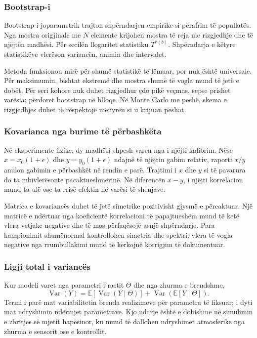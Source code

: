 \documentclass[11pt,oneside,openany]{book}
\newcommand{\E}{\mathbb{E}}
\newcommand{\Var}{\operatorname{Var}}
\begin{document}
\subsubsection{Bootstrap-i}
Bootstrap-i joparametrik trajton shpërndarjen empirike si përafrim të popullatës. Nga mostra origjinale me $N$ elemente krijohen mostra të reja me rizgjedhje dhe të njëjtën madhësi. Për secilën llogaritet statistiku $T^{*(b)}$. Shpërndarja e këtyre statistikëve vlerëson variancën, animin dhe intervalet.

Metoda funksionon mirë për shumë statistikë të lëmuar, por nuk është universale. Për maksimumin, bishtat ekstremë dhe mostra shumë të vogla mund të jetë e dobët. Për seri kohore nuk duhet rizgjedhur çdo pikë veçmas, sepse prishet varësia; përdoret bootstrap në blloqe. Në Monte Carlo me peshë, skema e rizgjedhjes duhet të respektojë mënyrën si u krijuan peshat.

\subsubsection{Kovarianca nga burime të përbashkëta}
Në eksperimente fizike, dy madhësi shpesh varen nga i njëjti kalibrim. Nëse $x=x_0(1+\epsilon)$ dhe $y=y_0(1+\epsilon)$ ndajnë të njëjtin gabim relativ, raporti $x/y$ anulon gabimin e përbashkët në rendin e parë. Trajtimi i $x$ dhe $y$ si të pavarura do ta mbivlerësonte pacaktueshmërinë. Në diferencën $x-y$, i njëjti korrelacion mund ta ulë ose ta rrisë efektin në varësi të shenjave.

Matrica e kovariancës duhet të jetë simetrike pozitivisht gjysmë e përcaktuar. Një matricë e ndërtuar nga koeficientë korrelacioni të papajtueshëm mund të ketë vlera vetjake negative dhe të mos përfaqësojë asnjë shpërndarje. Para kampionimit shumënormal kontrollohen simetria dhe spektri; vlera të vogla negative nga rrumbullakimi mund të kërkojnë korrigjim të dokumentuar.

\subsubsection{Ligji total i variancës}
Kur modeli varet nga parametri i rastit $\Theta$ dhe nga zhurma e brendshme,
\begin{equation}
 \Var(Y)=\E[\Var(Y\mid\Theta)]
 +\Var(\E[Y\mid\Theta]).
\end{equation}
Termi i parë mat variabilitetin brenda realizimeve për parametra të fiksuar; i dyti mat ndryshimin ndërmjet parametrave. Kjo ndarje është e dobishme në simulimin e zbritjes së mjetit hapësinor, ku mund të dallohen ndryshimet atmosferike nga zhurma e sensorit ose e kontrollit.
\end{document}
